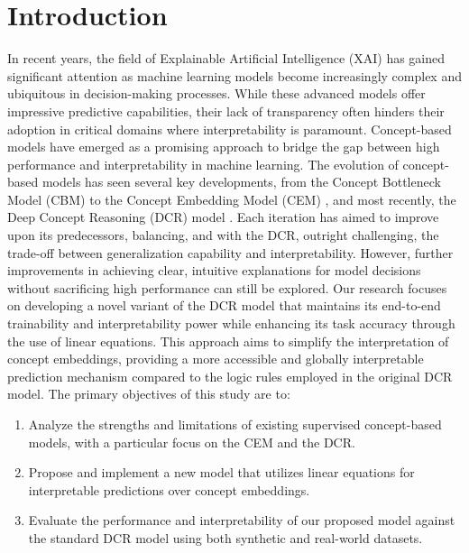 \documentclass[sigconf, nonacm]{acmart}
\begin{document}
\keywords{}



\maketitle

\section{Introduction}
\vspace{2pt}
In recent years, the field of Explainable Artificial Intelligence (XAI) has gained significant attention as machine learning models become increasingly complex and ubiquitous in decision-making processes. While these advanced models offer impressive predictive capabilities, their lack of transparency often hinders their adoption in critical domains where interpretability is paramount. Concept-based models have emerged as a promising approach to bridge the gap between high performance and interpretability in machine learning.
The evolution of concept-based models has seen several key developments, from the Concept Bottleneck Model (CBM) \cite{koh2020concept} to the Concept Embedding Model (CEM) \cite{espinosa2022concept}, and most recently, the Deep Concept Reasoning (DCR) model \cite{barbiero2023interpretable}. Each iteration has aimed to improve upon its predecessors, balancing, and with the DCR, outright challenging, the trade-off between generalization capability and interpretability. However, further improvements in achieving clear, intuitive explanations for model decisions without sacrificing high performance can still be explored.
Our research focuses on developing a novel variant of the DCR model that maintains its end-to-end trainability and interpretability power while enhancing its task accuracy through the use of linear equations. This approach aims to simplify the interpretation of concept embeddings, providing a more accessible and globally interpretable prediction mechanism compared to the logic rules employed in the original DCR model.
The primary objectives of this study are to: \vspace{2pt}

\begin{enumerate}
    \item Analyze the strengths and limitations of existing supervised concept-based models, with a particular focus on the CEM and the DCR. \vspace{4pt}
    \item Propose and implement a new model that utilizes linear equations for interpretable predictions over concept embeddings. \vspace{8pt}
    \item Evaluate the performance and interpretability of our proposed model against the standard DCR model using both synthetic and real-world datasets. \vspace{2pt}
\end{enumerate}
\end{document}
